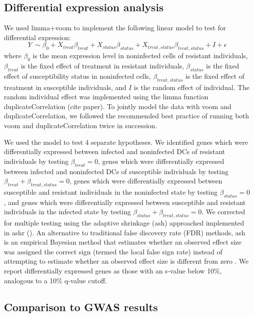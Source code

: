 \documentclass[fleqn,10pt]{wlscirep}
\begin{document}
\subsection*{Differential expression analysis}

We used limma+voom \cite{Smyth2004, Law2014, Ritchie2015} to implement the following linear model to test for differential expression:
\begin{equation} \label{eq:limma}
Y\ \sim \beta_{0} + X_{treat}\beta_{treat} + X_{status}\beta_{status} + X_{treat,status}\beta_{treat,status} + I + \epsilon
\end{equation}
where $\beta_{0}$ is the mean expression level in noninfected cells of resistant individuals, $\beta_{treat}$ is the fixed effect of treatment in resistant individuals, $\beta_{status}$ is the fixed effect of susceptibility status in noninfected cells, $\beta_{treat,status}$ is the fixed effect of treatment in susceptible individuals, and $I$ is the random effect of individual. The random individual effect was implemented using the limma function duplicateCorrelation (cite paper). To jointly model the data with voom and duplicateCorrelation, we followed the recommended best practice of running both voom and duplicateCorrelation twice in succession.

We used the model to test 4 separate hypotheses. We identified genes which were differentially expressed between infected and noninfected DCs of resistant individuals by testing $\beta_{treat} = 0$, genes which were differentially expressed between infected and noninfected DCs of susceptible individuals by testing $\beta_{treat} + \beta_{treat,status} = 0$, genes which were differentially expressed between susceptible and resistant individuals in the noninfected state by testing $\beta_{status} = 0$, and genes which were differentially expressed between susceptible and resistant individuals in the infected state by testing $\beta_{status} + \beta_{treat,status} = 0$. We corrected for multiple testing using the adaptive shrinkage (ash) approached implemented in ashr (). An alternative to traditional false discovery rate (FDR) methods, ash is an empirical Bayesian method that estimates whether an observed effect size was assigned the correct sign (termed the local false sign rate) instead of attempting to estimate whether an observed effect size is different from zero \cite{Stephens2016}. We report differentially expressed genes as those with an s-value below 10\%, analogous to a 10\% q-value cutoff.
\subsection*{Comparison to GWAS results}
\end{document}
